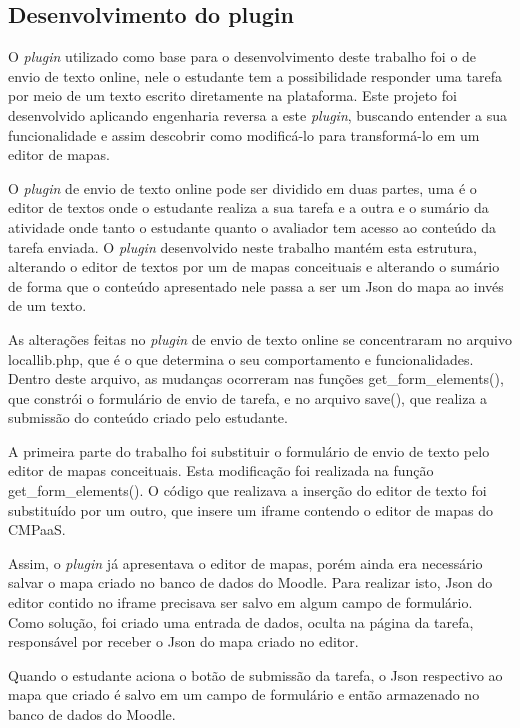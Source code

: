 \documentclass[
	12pt,				%
	openright,			%
	oneside,			%
	a4paper,			%
	english,			%
	french,				%
	spanish,			%
	brazil				%
	]{abntex2}
\begin{document}
\subsection{Desenvolvimento do plugin}
O \textit{plugin} utilizado como base para o desenvolvimento deste trabalho foi o de envio de texto online, nele o estudante tem a possibilidade responder uma tarefa por meio de um texto escrito diretamente na plataforma. Este projeto foi desenvolvido aplicando engenharia reversa a este \textit{plugin}, buscando entender a sua funcionalidade e assim descobrir como modificá-lo para transformá-lo em um editor de mapas.

O \textit{plugin} de envio de texto online pode ser dividido em duas partes, uma é o editor de textos onde o estudante realiza a sua tarefa e a outra e o sumário da atividade onde tanto o estudante quanto o avaliador tem acesso ao conteúdo da tarefa enviada. O \textit{plugin} desenvolvido neste trabalho mantém esta estrutura, alterando o editor de textos por um de mapas conceituais e alterando o sumário de forma que o conteúdo apresentado nele passa a ser um Json do mapa ao invés de um texto.

As alterações feitas no \textit{plugin} de envio de texto online se concentraram no arquivo locallib.php, que é o que determina o seu comportamento e funcionalidades. Dentro deste arquivo, as mudanças ocorreram nas funções get\_form\_elements(), que constrói o formulário de envio de tarefa, e no arquivo save(), que realiza a submissão do conteúdo criado pelo estudante.

A primeira parte do trabalho foi substituir o formulário de envio de texto pelo editor de mapas conceituais. Esta modificação foi realizada na função get\_form\_elements(). O código que realizava a inserção do editor de texto foi substituído por um outro, que insere um iframe contendo o editor de mapas do CMPaaS. 

Assim, o \textit{plugin} já apresentava o editor de mapas, porém ainda era necessário salvar o mapa criado no banco de dados do Moodle. Para realizar isto, Json do editor contido no iframe precisava ser salvo em algum campo de formulário. Como solução, foi criado uma entrada de dados, oculta na página da tarefa, responsável por receber o Json do mapa criado no editor.

Quando o estudante aciona o botão de submissão da tarefa, o Json respectivo ao mapa que criado é salvo em um campo de formulário e então armazenado no banco de dados do Moodle.
\end{document}
